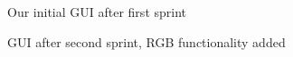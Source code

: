 \documentclass[11pt]{article} %
\begin{document}
{  
  \begin{figure}[H]
  	\centering
  	\caption{Our initial GUI after first sprint}
  	\label{fig:GUI Design 1}
  \end{figure}
  
  \begin{figure}[H]
  	\centering
  	\caption{GUI after second sprint, RGB functionality added}
  	\label{fig:GUI Design 2}
  \end{figure}  
  
}
\end{document}

